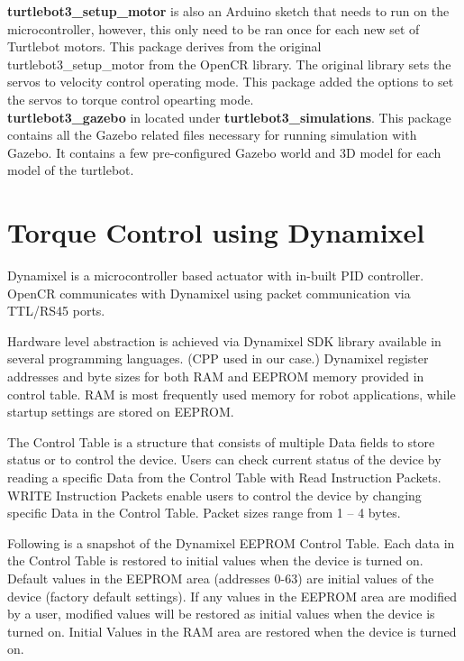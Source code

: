 \documentclass[12]{article}
\begin{document}
\textbf{turtlebot3\_setup\_motor} is also an Arduino sketch that needs to run on the microcontroller, however, 
this only need to be ran once for each new set of Turtlebot motors. 
This package derives from the original turtlebot3\_setup\_motor from the OpenCR library. The original library sets the servos to velocity control operating mode. 
This package added the options to set the servos to torque control opearting mode. \\

\textbf{turtlebot3\_gazebo} in located under \textbf{turtlebot3\_simulations}. This package contains all the Gazebo related files necessary for running simulation with Gazebo. 
It contains a few pre-configured Gazebo world and 3D model for each model of the turtlebot. 

\section{Torque Control using Dynamixel}
       
Dynamixel is a microcontroller based actuator with in-built PID controller. OpenCR communicates with Dynamixel using packet communication via TTL/RS45 ports. 

Hardware level abstraction is achieved via Dynamixel SDK library available in several programming languages. (CPP used in our case.)
Dynamixel register addresses and byte sizes for both RAM and EEPROM memory provided in control table. RAM is most frequently used memory for robot applications, while startup settings are stored on EEPROM.

The Control Table is a structure that consists of multiple Data fields to store status or to control the device. Users can check current status of the device by reading a specific Data from the Control Table with Read Instruction Packets. WRITE Instruction Packets enable users to control the device by changing specific Data in the Control Table. Packet sizes range from 1 – 4 bytes.

Following is a snapshot of the Dynamixel EEPROM Control Table. Each data in the Control Table is restored to initial values when the device is turned on. Default values in the EEPROM area (addresses 0-63) are initial values of the device (factory default settings). If any values in the EEPROM area are modified by a user, modified values will be restored as initial values when the device is turned on. Initial Values in the RAM area are restored when the device is turned on.
\end{document}
